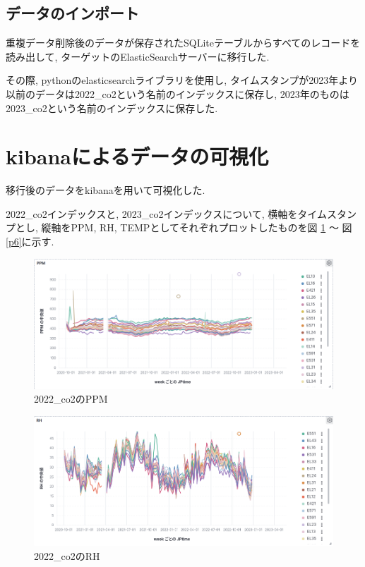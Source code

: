 \documentclass[a4j,12pt,]{jarticle}
\begin{document}
\subsection{データのインポート}
重複データ削除後のデータが保存されたSQLiteテーブルからすべてのレコードを読み出して, ターゲットのElasticSearchサーバーに移行した.

その際, pythonのelasticsearchライブラリを使用し, タイムスタンプが2023年より以前のデータは2022\_co2という名前のインデックスに保存し, 2023年のものは2023\_co2という名前のインデックスに保存した.

\section{kibanaによるデータの可視化}

移行後のデータをkibanaを用いて可視化した.

2022\_co2インデックスと, 2023\_co2インデックスについて, 横軸をタイムスタンプとし, 縦軸をPPM, RH, TEMPとしてそれぞれプロットしたものを図 \ref{p1} 〜 図 \ref{p6}に示す.

\begin{figure}[H]
  \begin{center}
    \includegraphics[width=160mm]{2022_ppm.png}
    \caption{2022\_co2のPPM}
    \label{p1}
  \end{center}
\end{figure}

\begin{figure}[H]
  \begin{center}
    \includegraphics[width=160mm]{2022_rh.png}
    \caption{2022\_co2のRH}
    \label{p2}
  \end{center}
\end{figure}
\end{document}

